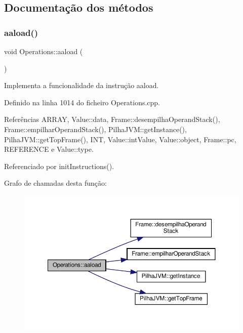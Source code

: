 \subsection{Documentação dos métodos}
\mbox{\label{classOperations_a522dfa2224d54268008f3bec4ff2b388}} 
\subsubsection{\texorpdfstring{aaload()}{aaload()}}
{\footnotesize\ttfamily void Operations\+::aaload (\begin{DoxyParamCaption}{ }\end{DoxyParamCaption})\hspace{0.3cm}{\ttfamily [private]}}



Implementa a funcionalidade da instrução aaload. 



Definido na linha 1014 do ficheiro Operations.\+cpp.



Referências A\+R\+R\+AY, Value\+::data, Frame\+::desempilha\+Operand\+Stack(), Frame\+::empilhar\+Operand\+Stack(), Pilha\+J\+V\+M\+::get\+Instance(), Pilha\+J\+V\+M\+::get\+Top\+Frame(), I\+NT, Value\+::int\+Value, Value\+::object, Frame\+::pc, R\+E\+F\+E\+R\+E\+N\+CE e Value\+::type.



Referenciado por init\+Instructions().

Grafo de chamadas desta função\+:\nopagebreak
\begin{figure}[H]
\begin{center}
\leavevmode
\includegraphics[width=350pt]{classOperations_a522dfa2224d54268008f3bec4ff2b388_cgraph}
\end{center}
\end{figure}
\mbox{\label{classOperations_a60b30bd84b2d59334e735f0adda6febe}} 
